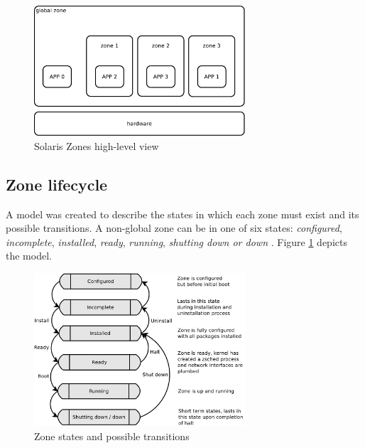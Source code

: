 \documentclass[11pt,openany]{book}
\begin{document}
        \begin{figure}[H]
          \begin{center}
            \includegraphics[width=0.7\textwidth]{img/solaris/zones-high-level.pdf}
          \end{center}

          \caption{Solaris Zones high-level view}
        \end{figure}


      \subsection{Zone lifecycle}
      \label{sub:}

        A model was created to describe the states in which each zone must exist and its possible transitions. A
        non-global zone can be in one of six states: \textit{configured}, \textit{incomplete}, \textit{installed},
        \textit{ready}, \textit{running}, \textit{shutting down or down} \cite{sag}. Figure \ref{fig:sol:lifecycle}
        depicts the model.

        \begin{figure}[H]
          \begin{center}
            \includegraphics[width=0.7\textwidth]{img/solaris/zone_states.pdf}
          \end{center}

          \caption{Zone states and possible transitions}
          \label{fig:sol:lifecycle}
        \end{figure}
\end{document}
